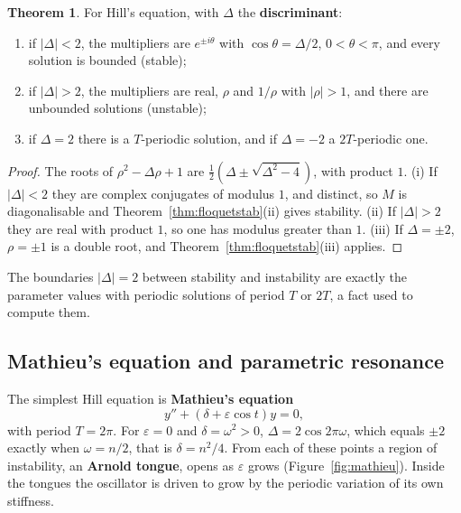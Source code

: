 \documentclass[11pt,a4paper]{article}
\numberwithin{equation}{section}
\theoremstyle{definition}
\newtheorem{thm}{Theorem}[subsection]
\begin{document}
\begin{thm}
\label{thm:hill}
For Hill's equation, with $\Delta$ the \textbf{discriminant}:
\begin{enumerate}[label=(\roman*)]
\item if $|\Delta| < 2$, the multipliers are $e^{\pm i\theta}$ with $\cos\theta = \Delta/2$, $0 < \theta < \pi$, and every solution is bounded (stable);
\item if $|\Delta| > 2$, the multipliers are real, $\rho$ and $1/\rho$ with $|\rho| > 1$, and there are unbounded solutions (unstable);
\item if $\Delta = 2$ there is a $T$-periodic solution, and if $\Delta = -2$ a $2T$-periodic one.
\end{enumerate}
\end{thm}

\begin{proof}
The roots of $\rho^2 - \Delta\rho + 1$ are $\frac12(\Delta \pm \sqrt{\Delta^2 - 4})$, with product $1$. (i) If $|\Delta| < 2$ they are complex conjugates of modulus $1$, and distinct, so $M$ is diagonalisable and
Theorem~\ref{thm:floquetstab}(ii) gives stability. (ii) If $|\Delta| > 2$ they are real with product $1$, so one has modulus greater than $1$. (iii) If $\Delta = \pm2$, $\rho = \pm1$ is a double root, and
Theorem~\ref{thm:floquetstab}(iii) applies.
\end{proof}

The boundaries $|\Delta| = 2$ between stability and instability are exactly the parameter values with periodic solutions of period $T$ or $2T$, a fact used to compute them.

\subsection{Mathieu's equation and parametric resonance}
\label{ssec:mathieu}

The simplest Hill equation is \textbf{Mathieu's equation}
\[
y'' + (\delta + \varepsilon\cos t)y = 0 ,
\]
with period $T = 2\pi$. For $\varepsilon = 0$ and $\delta = \omega^2 > 0$, $\Delta = 2\cos2\pi\omega$, which equals $\pm2$ exactly when $\omega = n/2$, that is $\delta = n^2/4$. From each of these points a region of instability,
an \textbf{Arnold tongue}, opens as $\varepsilon$ grows (Figure~\ref{fig:mathieu}). Inside the tongues the oscillator is driven to grow by the periodic variation of its own stiffness.
\end{document}
